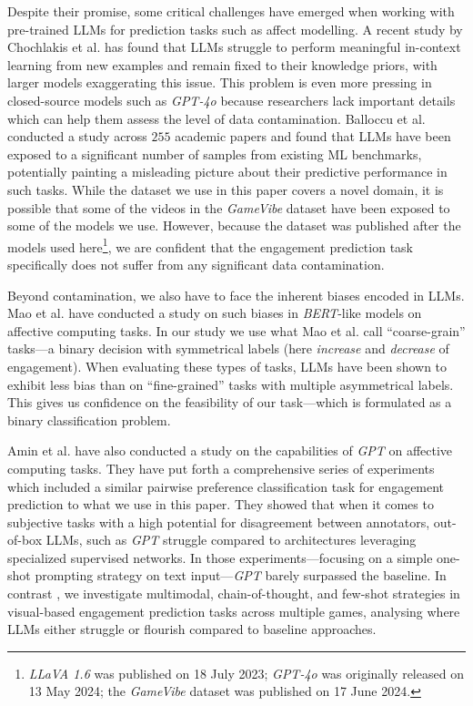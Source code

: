 Despite their promise, some critical challenges have emerged when working with pre-trained LLMs for prediction tasks such as affect modelling. A recent study by Chochlakis et al. \cite{chochlakis2024strong} has found that LLMs struggle to perform meaningful in-context learning from new examples and remain fixed to their knowledge priors, with larger models exaggerating this issue. This problem is even more pressing in closed-source models such as \emph{GPT-4o} because researchers lack important details which can help them assess the level of data contamination. Balloccu et al. \cite{balloccu2024leak} conducted a study across $255$ academic papers and found that LLMs have been exposed to a significant number of samples from existing ML benchmarks, potentially painting a misleading picture about their predictive performance in such tasks. 
%
While the dataset we use in this paper covers a novel domain, it is possible that some of the videos in the \emph{GameVibe} dataset have been exposed to some of the models we use. However, because the dataset was published after the models used here\footnote{\emph{LLaVA 1.6} was published on 18 July 2023; \emph{GPT-4o} was originally released on 13 May 2024; the \emph{GameVibe} dataset was published on 17 June 2024.}, we are confident that the engagement prediction task specifically does not suffer from any significant data contamination.

Beyond contamination, we also have to face the inherent biases encoded in LLMs. Mao et al. \cite{mao2022biases} have conducted a study on such biases in \emph{BERT}-like models \cite{devlin2018bert} on affective computing tasks. 
% 
In our study we use what Mao et al. call ``coarse-grain'' tasks---a binary decision with symmetrical labels (here \emph{increase} and \emph{decrease} of engagement). When evaluating these types of tasks, LLMs have been shown to exhibit less bias \cite{mao2022biases} than on ``fine-grained'' tasks with multiple asymmetrical labels. This gives us confidence on the feasibility of our task---which is formulated as a binary classification problem. 

Amin et al. \cite{amin2024wide} have also conducted a study on the capabilities of \emph{GPT} \cite{openai2023gpt4} on affective computing tasks. They have put forth a comprehensive series of experiments which included a similar pairwise preference classification task for engagement prediction to what we use in this paper. They showed that when it comes to subjective tasks with a high potential for disagreement between annotators, out-of-box LLMs, such as \emph{GPT} struggle compared to architectures leveraging specialized supervised networks. In those experiments---focusing  on a simple one-shot prompting strategy on text input---\emph{GPT} barely surpassed the baseline. In contrast \cite{amin2024wide}, we investigate multimodal, chain-of-thought, and few-shot strategies in visual-based engagement prediction tasks across multiple games, analysing where LLMs either struggle or flourish compared to baseline approaches.

